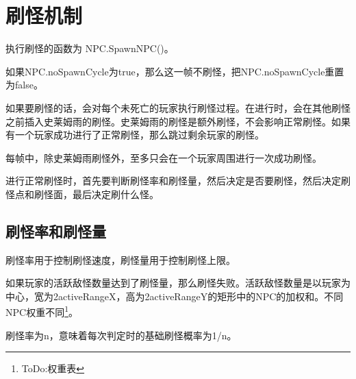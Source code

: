 \chapter{刷怪机制}
执行刷怪的函数为 NPC.SpawnNPC()。

如果NPC.noSpawnCycle为true，那么这一帧不刷怪，把NPC.noSpawnCycle重置为false。

如果要刷怪的话，会对每个未死亡的玩家执行刷怪过程。在进行时，会在其他刷怪之前插入史莱姆雨的刷怪。史莱姆雨的刷怪是额外刷怪，不会影响正常刷怪。如果有一个玩家成功进行了正常刷怪，那么跳过剩余玩家的刷怪。

\begin{remark}
每帧中，除史莱姆雨刷怪外，至多只会在一个玩家周围进行一次成功刷怪。
\end{remark}

进行正常刷怪时，首先要判断刷怪率和刷怪量，然后决定是否要刷怪，然后决定刷怪点和刷怪面，最后决定刷什么怪。

\section{刷怪率和刷怪量}
刷怪率用于控制刷怪速度，刷怪量用于控制刷怪上限。

如果玩家的活跃敌怪数量达到了刷怪量，那么刷怪失败。活跃敌怪数量是以玩家为中心，宽为2activeRangeX，高为2activeRangeY的矩形中的NPC的加权和。不同NPC权重不同\footnote{ToDo:权重表}。

刷怪率为n，意味着每次判定时的基础刷怪概率为1/n。

